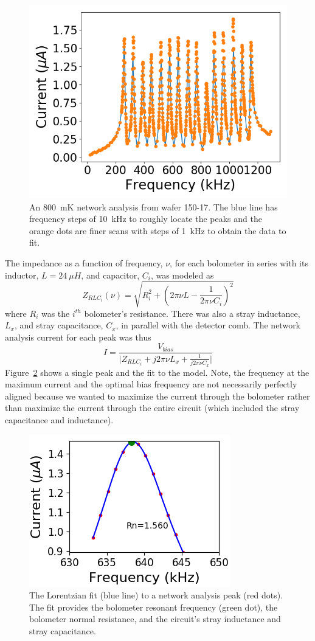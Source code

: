 \begin{figure}[htbp]
\begin{center}
\includegraphics[width=0.6\columnwidth]{figures/SqCh3_netanal.png}
\caption{An 800~mK network analysis from wafer 150-17. The blue line has frequency steps of 10~kHz to roughly locate the peaks and the orange dots are finer scans with steps of 1~kHz to obtain the data to fit. 
\label{fig:network_analysis} }
\end{center}
\end{figure}

The impedance as a function of frequency, $\nu$, for each bolometer in series with its inductor, $L=24~\mu H$, and capacitor, $C_{i}$, was modeled as
\begin{equation}
Z_{RLC_{i}} \left(\nu\right) = \sqrt{ R_{i}^{2} + \left(2\pi \nu L - \frac{1}{2\pi \nu C_{i}}\right)^{2}}
\end{equation}
where $R_{i}$ was the $i^{th}$ bolometer's resistance.
There was also a stray inductance, $L_{x}$, and stray capacitance, $C_{x}$, in parallel with the detector comb. 
The network analysis current for each peak was thus
\begin{equation}
I = \frac{V_{bias}}{\lvert Z_{RLC_{i}} + j 2\pi \nu L_{x} + \frac{1}{j 2\pi \nu C_{x}}\rvert}
\end{equation}
Figure~\ref{fig:netanal_fit} shows a single peak and the fit to the model.
Note, the frequency at the maximum current and the optimal bias frequency are not necessarily perfectly aligned because we wanted to maximize the current through the bolometer rather than maximize the current through the entire circuit (which included the stray capacitance and inductance).

\begin{figure}[htbp]
\begin{center}
\includegraphics[width=0.3\columnwidth]{figures/netanal_etcsqb_SqCh3_10K_20110606_5to8.png}
\caption{The Lorentzian fit (blue line) to a network analysis peak (red dots). The fit provides the bolometer resonant frequency (green dot), the bolometer normal resistance, and the circuit's stray inductance and stray capacitance. 
\label{fig:netanal_fit} }
\end{center}
\end{figure}

